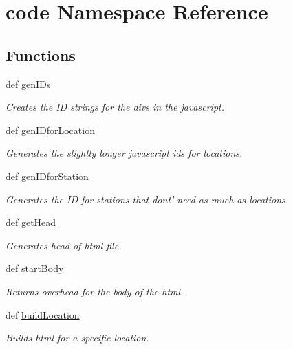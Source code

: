 \hypertarget{namespacecode}{\section{code Namespace Reference}
\label{namespacecode}
}
\subsection*{Functions}
\begin{DoxyCompactItemize}
\item 
def \hyperlink{namespacecode_a4c04c9f20e1c3ab4e0f9557f50c9fb54}{gen\-I\-Ds}
\begin{DoxyCompactList}\small\item\em Creates the I\-D strings for the divs in the javascript. \end{DoxyCompactList}\item 
def \hyperlink{namespacecode_a7f1e3c4624b7277c01c67c1cd640c728}{gen\-I\-Dfor\-Location}
\begin{DoxyCompactList}\small\item\em Generates the slightly longer javascript ids for locations. \end{DoxyCompactList}\item 
def \hyperlink{namespacecode_aaf2f49c28ee8d8b0577fb9ce44ccf1b4}{gen\-I\-Dfor\-Station}
\begin{DoxyCompactList}\small\item\em Generates the I\-D for stations that dont' need as much as locations. \end{DoxyCompactList}\item 
def \hyperlink{namespacecode_a346295107a9e0d66b8fb986b0985ff13}{get\-Head}
\begin{DoxyCompactList}\small\item\em Generates head of html file. \end{DoxyCompactList}\item 
def \hyperlink{namespacecode_a3537761456739767d9cab1643175b79d}{start\-Body}
\begin{DoxyCompactList}\small\item\em Returns overhead for the body of the html. \end{DoxyCompactList}\item 
def \hyperlink{namespacecode_a310a9c157a8d3f7a97d4f8af3e42be02}{build\-Location}
\begin{DoxyCompactList}\small\item\em Builds html for a specific location. \end{DoxyCompactList}\item 

\end{DoxyCompactItemize}
